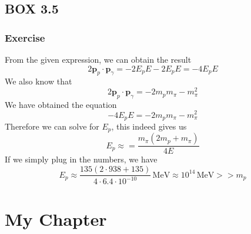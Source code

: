 \documentclass[12pt]{memoir}
\newcommand{\paren}[1]{\left( #1 \right)}
\begin{document}
    \section{BOX 3.5}
    \subsection{Exercise}
    From the given expression, we can obtain the result
    \[
    2\mathbf{p}_p\cdot \mathbf{p}_\gamma = -2E_pE-2E_pE = -4E_pE
    \]
    We also know that 
    \[
    2\mathbf{p}_p\cdot \mathbf{p}_\gamma = -2m_pm_{\pi} -m_{\pi}^2
    \]
    We have obtained the equation
    \[
     -4E_pE = -2m_pm_{\pi} -m_{\pi}^2
    \]
    Therefore we can solve for $E_p$, this indeed gives us
    \[
    E_p \approx = \frac{m_{\pi}\paren{2m_p + m_{\pi}}}{4E}
    \]
    If we simply plug in the numbers, we have
    \[
    E_p\approx \frac{135\paren{2\cdot938+135}}{4\cdot 6.4\cdot 10^{-10}}\,\text{MeV} \approx 10^{14}\,\text{MeV} >> m_p
    \]

\begingroup
\let\clearpage\relax
\chapter{My Chapter}
\endgroup 
            
            
\end{document}
